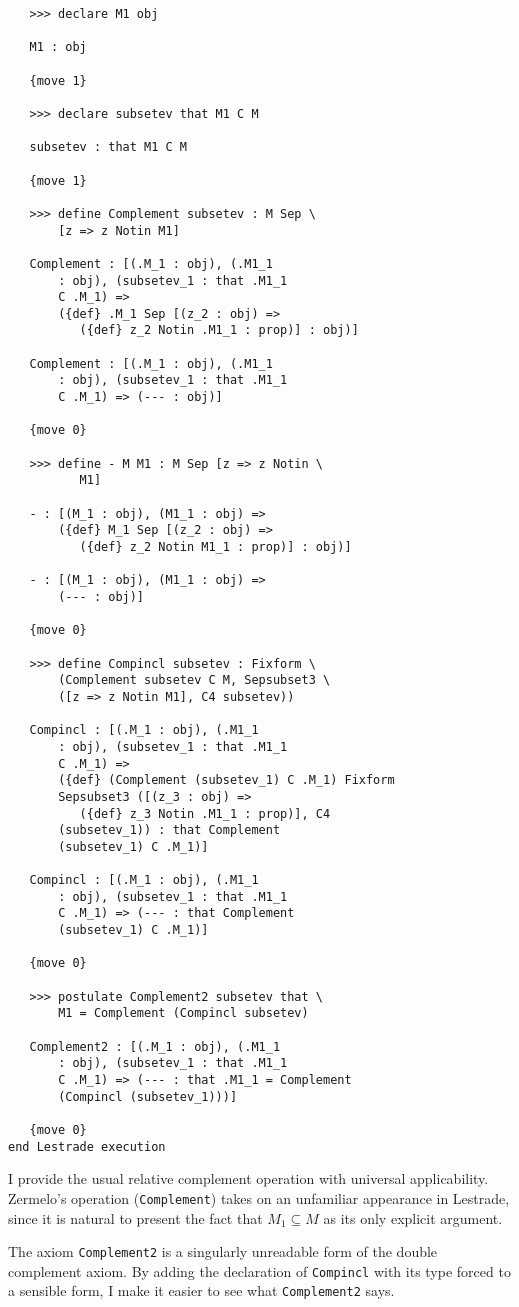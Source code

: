 \documentclass[12pt]{article}
\begin{document}
\begin{enumerate}
\begin{verbatim}
   >>> declare M1 obj

   M1 : obj

   {move 1}

   >>> declare subsetev that M1 C M

   subsetev : that M1 C M

   {move 1}

   >>> define Complement subsetev : M Sep \
       [z => z Notin M1]

   Complement : [(.M_1 : obj), (.M1_1 
       : obj), (subsetev_1 : that .M1_1 
       C .M_1) => 
       ({def} .M_1 Sep [(z_2 : obj) => 
          ({def} z_2 Notin .M1_1 : prop)] : obj)]

   Complement : [(.M_1 : obj), (.M1_1 
       : obj), (subsetev_1 : that .M1_1 
       C .M_1) => (--- : obj)]

   {move 0}

   >>> define - M M1 : M Sep [z => z Notin \
          M1]

   - : [(M_1 : obj), (M1_1 : obj) => 
       ({def} M_1 Sep [(z_2 : obj) => 
          ({def} z_2 Notin M1_1 : prop)] : obj)]

   - : [(M_1 : obj), (M1_1 : obj) => 
       (--- : obj)]

   {move 0}

   >>> define Compincl subsetev : Fixform \
       (Complement subsetev C M, Sepsubset3 \
       ([z => z Notin M1], C4 subsetev))

   Compincl : [(.M_1 : obj), (.M1_1 
       : obj), (subsetev_1 : that .M1_1 
       C .M_1) => 
       ({def} (Complement (subsetev_1) C .M_1) Fixform 
       Sepsubset3 ([(z_3 : obj) => 
          ({def} z_3 Notin .M1_1 : prop)], C4 
       (subsetev_1)) : that Complement 
       (subsetev_1) C .M_1)]

   Compincl : [(.M_1 : obj), (.M1_1 
       : obj), (subsetev_1 : that .M1_1 
       C .M_1) => (--- : that Complement 
       (subsetev_1) C .M_1)]

   {move 0}

   >>> postulate Complement2 subsetev that \
       M1 = Complement (Compincl subsetev)

   Complement2 : [(.M_1 : obj), (.M1_1 
       : obj), (subsetev_1 : that .M1_1 
       C .M_1) => (--- : that .M1_1 = Complement 
       (Compincl (subsetev_1)))]

   {move 0}
end Lestrade execution

\end{verbatim}

I provide the usual relative complement operation with universal applicability.  Zermelo's operation ({\tt Complement}) takes on an unfamiliar appearance in Lestrade, since it is natural to present the fact that $M_1 \subseteq M$ as its only explicit argument.

The axiom {\tt Complement2} is a singularly unreadable form of the double complement axiom.  By adding the declaration of
{\tt Compincl} with its type forced to a sensible form, I make it easier to see what {\tt Complement2} says.

\end{enumerate}
\end{document}
